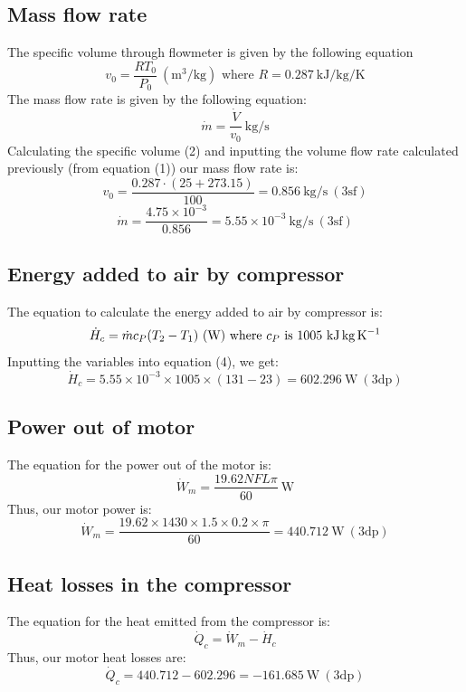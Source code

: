 \documentclass[class=article, crop=false, 12pt,a4paper]{standalone}
\begin{document}
\subsection{Mass flow rate}
The specific volume through flowmeter is given by the following equation
\begin{equation}
  v_0 = \frac{RT_0}{P_0} \ (\si{\meter\cubed\per\kg}) \textrm{ where \(R = 0.287 \ \si{\kilo\joule\per\kg\per\kelvin}\)}
  \label{specvol}
\end{equation}
The mass flow rate is given by the following equation:
\begin{equation}
  \dot{m} = \frac{\dot{V}}{v_0} \ \si{\kg\per\second}
  \label{massflowrate}
\end{equation}
Calculating the specific volume (2) and inputting the volume flow rate calculated previously (from equation (1)) our mass flow rate is:
\[ v_0 = \frac{0.287 \cdot (25+273.15)}{100} = 0.856 \ \si{\kg\per\second} \ (3\textrm{sf})  \]
\[ \dot{m} = \frac{4.75 \times 10^{-3}}{0.856} = 5.55 \times 10^{-3} \ \si{\kg\per\second} \ (3\textrm{sf}) \]
\subsection{Energy added to air by compressor}
The equation to calculate the energy added to air by compressor is:
\begin{equation}
  \dot{H}_c = \dot{m}c_P(T_2-T_1) \ (\si{\watt}) \textrm{ where \(c_P\) is 1005 \si{\kilo\joule\kg\per\kelvin}}
  \label{energyaddaircompressor}
\end{equation}
Inputting the variables into equation (4), we get: 
\[ \dot{H}_c = 5.55 \times 10^{-3} \times 1005 \times (131-23) = 602.296 \ \si{\watt} \ (3\textrm{dp}) \]
\subsection{Power out of motor}
The equation for the power out of the motor is:
\begin{equation}
  \dot{W}_{m} = \frac{19.62NFL\pi}{60} \ \si{\watt}
  \label{motorpower}
\end{equation}
Thus, our motor power is:
\[ \dot{W}_{m} = \frac{19.62 \times 1430 \times 1.5 \times 0.2 \times \pi}{60} = 440.712 \ \si{\watt} \ (3\textrm{dp}) \]
\subsection{Heat losses in the compressor}
The equation for the heat emitted from the compressor is:
\begin{equation}
  \dot{Q}_c = \dot{W}_m - \dot{H}_c
  \label{heatlosscompressor}
\end{equation}
Thus, our motor heat losses are:
\[ \dot{Q}_c = 440.712 - 602.296 = -161.685 \ \si{\watt} \ (3\textrm{dp}) \]
\end{document}
